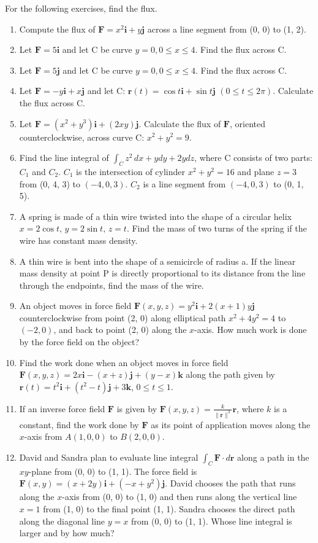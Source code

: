\documentclass{exercises}
\begin{document}
For the following exercises, find the flux.

\begin{enumerate}[resume]
\item Compute the flux of $\mathbf{F}=x^{2}\mathbf{i}+y\mathbf{j}$ across a line segment from (0, 0) to (1, 2).
\item Let $\mathbf{F}=5\mathbf{i}$ and let C be curve $y=0,0\le x\le4$. Find the flux across C.
\item Let $\mathbf{F}=5\mathbf{j}$ and let C be curve $y=0,0\le x\le4$. Find the flux across C.
\item Let $\mathbf{F}=-y\mathbf{i}+x\mathbf{j}$ and let C: $\mathbf{r}(t)=\cos t\mathbf{i}+\sin t\mathbf{j}$ $(0\le t\le2\pi)$. Calculate the flux across C.
\item Let $\mathbf{F}=(x^{2}+y^{3})\mathbf{i}+(2xy)\mathbf{j}$. Calculate the flux of $\mathbf{F}$, oriented counterclockwise, across curve C: $x^{2}+y^{2}=9$.
\item Find the line integral of $\int_{C}^{}z^{2}\,dx+ydy+2ydz$, where C consists of two parts: $C_{1}$ and $C_{2}$. $C_{1}$ is the intersection of cylinder $x^{2}+y^{2}=16$ and plane $z=3$ from (0, 4, 3) to $(-4,0,3)$. $C_{2}$ is a line segment from $(-4,0,3)$ to (0, 1, 5).
\item A spring is made of a thin wire twisted into the shape of a circular helix $x=2\cos t,\,y=2\sin t,\,z=t$. Find the mass of two turns of the spring if the wire has constant mass density.
\item A thin wire is bent into the shape of a semicircle of radius a. If the linear mass density at point P is directly proportional to its distance from the line through the endpoints, find the mass of the wire.
\item An object moves in force field $\mathbf{F}(x,y,z)=y^{2}\mathbf{i}+2(x+1)y\mathbf{j}$ counterclockwise from point (2, 0) along elliptical path $x^{2}+4y^{2}=4$ to $(-2,0)$, and back to point (2, 0) along the $x$-axis. How much work is done by the force field on the object?
\item Find the work done when an object moves in force field $\mathbf{F}(x,y,z)=2x\mathbf{i}-(x+z)\mathbf{j}+(y-x)\mathbf{k}$ along the path given by $\mathbf{r}(t)=t^{2}\mathbf{i}+(t^{2}-t)\mathbf{j}+3\mathbf{k}$, $0\le t\le1$.
\item If an inverse force field $\mathbf{F}$ is given by $\mathbf{F}(x,y,z)=\frac{k}{\|\mathbf{r}\|^{3}}\mathbf{r}$, where $k$ is a constant, find the work done by $\mathbf{F}$ as its point of application moves along the $x$-axis from $A(1,0,0)$ to $B(2,0,0)$.
\item David and Sandra plan to evaluate line integral $\int_{C}^{}\mathbf{F}\cdot d\mathbf{r}$ along a path in the $xy$-plane from (0, 0) to (1, 1). The force field is $\mathbf{F}(x,y)=(x+2y)\mathbf{i}+(-x+y^{2})\mathbf{j}$. David chooses the path that runs along the $x$-axis from (0, 0) to (1, 0) and then runs along the vertical line $x=1$ from (1, 0) to the final point (1, 1). Sandra chooses the direct path along the diagonal line $y=x$ from (0, 0) to (1, 1). Whose line integral is larger and by how much?
\end{enumerate}
\end{document}
